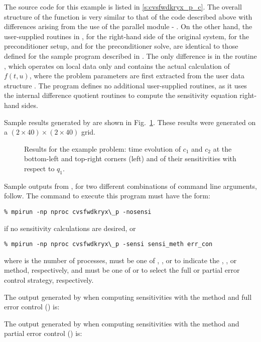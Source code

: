 The source code for this example is listed in \A\ref{s:cvsfwdkryx_p_c}.
The overall structure of the  function is very
similar to that of the code  described above with 
differences arising from the use of the parallel {\nvector} module - {\nvecp}.
On the other hand, the user-supplied routines in ,
 for the right-hand side of the original system,
 for the preconditioner setup, and  for the
preconditioner solve, are identical to those defined for the sample program
 described in \cite{cvode2.4.0_ex}. The only difference is in the
routine , which operates on local data only and contains the actual 
calculation of $f(t,u)$, where the problem parameters are first extracted from
the user data structure . The program  defines no additional
user-supplied routines, as it uses the {\cvodes} internal difference quotient routines 
to compute the sensitivity equation right-hand sides.

Sample results generated by  are shown in Fig.~\ref{f:cvsfwdkryx_p}. 
These results were generated on a $(2\times40)\times(2\times40)$ grid.
\begin{figure}
  {\centerline{}}
  \caption{Results for the  example problem:
    time evolution of $c_1$ and $c_2$ at the bottom-left and top-right corners
    (left) and of their sensitivities with respect to $q_1$.}
  \label{f:cvsfwdkryx_p}
\end{figure}

Sample outputs from , for two different combinations of command line arguments, 
follow. The command to execute this program must have the form:
\begin{verbatim}
% mpirun -np nproc cvsfwdkryx\_p -nosensi
\end{verbatim} 
if no sensitivity calculations are desired, or
\begin{verbatim}
% mpirun -np nproc cvsfwdkryx\_p -sensi sensi_meth err_con
\end{verbatim}
where  is the number of processes,  must be one of , 
, or  to
indicate the , , or  method,
respectively, and  must be one of  or  to
select the full or partial error control strategy, respectively.

The output generated by  when computing sensitivities with the 
method and full error control () is:


The output generated by  when computing sensitivities with the 
method and partial error control () is:


